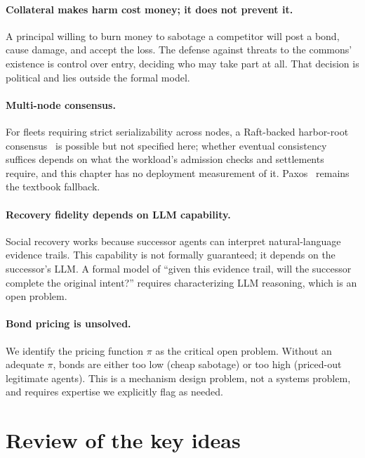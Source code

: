 \documentclass[11pt,a4paper]{article}
\theoremstyle{definition}
\theoremstyle{remark}
\begin{document}
\paragraph{Collateral makes harm cost money; it does not prevent it.} A principal willing to burn money to sabotage a competitor will post a bond, cause damage, and accept the loss. The defense against threats to the commons' existence is control over entry, deciding who may take part at all. That decision is political and lies outside the formal model.

\paragraph{Multi-node consensus.} For fleets requiring strict serializability across nodes, a Raft-backed harbor-root consensus~ is possible but not specified here; whether eventual consistency suffices depends on what the workload's admission
checks and settlements require, and this chapter has no deployment measurement
of it. Paxos~ remains the textbook fallback.

\paragraph{Recovery fidelity depends on LLM capability.} Social recovery works because successor agents can interpret natural-language evidence trails. This capability is not formally guaranteed; it depends on the successor's LLM. A formal model of ``given this evidence trail, will the successor complete the original intent?'' requires characterizing LLM reasoning, which is an open problem.

\paragraph{Bond pricing is unsolved.} We identify the pricing function $\pi$ as the critical open problem. Without an adequate $\pi$, bonds are either too low (cheap sabotage) or too high (priced-out legitimate agents). This is a mechanism design problem, not a systems problem, and requires expertise we explicitly flag as needed.

\pdexercisepointer{\ref{ex:bonded-gossip-proof}}{\ref{ex:bonded-cuckoo-pollution}}{\pageref{ex:bonded-gossip-proof}}

\section*{Review of the key ideas}
\end{document}
